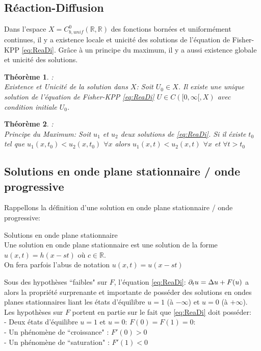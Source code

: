 \subsection{Réaction-Diffusion}
Dans l’espace $X=C^0_{b,unif}(\mathbb{R},\mathbb{R})$ des fonctions bornées et uniformément continues, il y a existence locale et unicité des solutions de l’équation de Fisher-KPP \eqref{eq:ReaDi}. Grâce à un principe du maximum, il y a aussi existence globale et unicité des solutions.
\newtheorem{theorem}{Théorème}
\begin{theorem}:\\ Existence et Unicité de la solution dans $X$: Soit $U_0 \in X$. Il existe une unique solution de l'équation de Fisher-KPP \eqref{eq:ReaDi}  $U \in C([0,\infty[,X)$ avec condition initiale $U_0$. \end{theorem}
\begin{theorem}:\\ Principe du Maximum: Soit $u_1$ et $u_2$ deux solutions de \eqref{eq:ReaDi}. Si il éxiste $t_0$ tel que $u_1(x,t_0)<u_2(x,t_0) $ $\forall x$ alors $u_1(x,t)<u_2(x,t)$  $ \forall x$ et $\forall t>t_0$ \end{theorem}

\subsection{Solutions en onde plane stationnaire / onde progressive}
Rappellons la définition d'une solution en onde plane stationnaire / onde progressive:
\begin{definition}{Solutions en onde plane stationnaire}\\Une solution en onde plane stationnaire est une solution de la forme $u(x,t)=h(x-st)$ où $c \in \mathbb{R} $.\\ On fera parfois l'abus de notation $u(x,t)=u(x-st)$
\end{definition}
Sous des hypothèses ``faibles" sur $F$, l'équation \eqref{eq:ReaDi}: $\partial_t u = \Delta u + F(u)$ a alors la propriété surprenante et importante de posséder des solutions en ondes planes stationnaires liant les états d'équilibre $u=1$ (à $-\infty$) et $u=0$ (à $+\infty$).\\
Les hypothèses sur $F$ portent en partie sur le fait que \eqref{eq:ReaDi} doit posséder:\\
- Deux états d'équilibre $u=1$ et $u=0$: $F(0)=F(1)=0$:\\
- Un phénomène de ``croissance" : $F'(0)>0$\\
- Un phénomène de ``saturation" : $F'(1)<0$ \\
